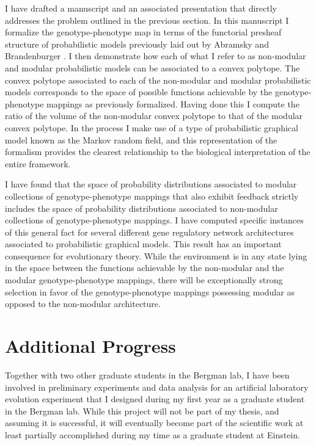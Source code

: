 \documentclass[11pt,letterpaper]{article}
\begin{document}
I have drafted a manuscript and an associated presentation that directly addresses the problem outlined in the previous section. In this manuscript I formalize the genotype-phenotype map in terms of the functorial presheaf structure of probabilistic models previously laid out by Abramsky and Brandenburger \cite{Abramsky2011}. I then demonstrate how each of what I refer to as non-modular and modular probabilistic models can be associated to a convex polytope. The convex polytope associated to each of the non-modular and modular probabilistic models corresponds to the space of possible functions achievable by the genotype-phenotype mappings as previously formalized. Having done this I compute the ratio of the volume of the non-modular convex polytope to that of the modular convex polytope. In the process I make use of a type of probabilistic graphical model known as the Markov random field, and this representation of the formalism provides the clearest relationship to the biological interpretation of the entire framework.

I have found that the space of probability distributions associated to modular collections of genotype-phenotype mappings that also exhibit feedback strictly includes the space of probability distributions associated to non-modular collections of genotype-phenotype mappings. I have computed specific instances of this general fact for several different gene regulatory network architectures associated to probabilistic graphical models. This result has an important consequence for evolutionary theory. While the environment is in any state lying in the space between the functions achievable by the non-modular and the modular genotype-phenotype mappings, there will be exceptionally strong selection in favor of the genotype-phenotype mappings possessing modular as opposed to the non-modular architecture.

\section{Additional Progress}
Together with two other graduate students in the Bergman lab, I have been involved in preliminary experiments and data analysis for an artificial laboratory evolution experiment that I designed during my first year as a graduate student in the Bergman lab. While this project will not be part of my thesis, and assuming it is successful, it will eventually become part of the scientific work at least partially accomplished during my time as a graduate student at Einstein.
\end{document}
